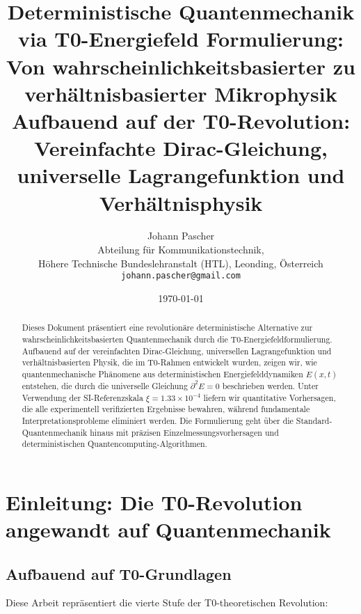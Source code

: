 \documentclass[12pt,a4paper]{article}
\newcommand{\Efield}{E}
\newcommand{\xipar}{\xi}
\begin{document}
	\title{Deterministische Quantenmechanik via T0-Energiefeld Formulierung: \\
		Von wahrscheinlichkeitsbasierter zu verhältnisbasierter Mikrophysik \\
		\large Aufbauend auf der T0-Revolution: Vereinfachte Dirac-Gleichung, universelle Lagrangefunktion und Verhältnisphysik}
	\author{Johann Pascher\\
		Abteilung für Kommunikationstechnik, \\Höhere Technische Bundeslehranstalt (HTL), Leonding, Österreich\\
		\texttt{johann.pascher@gmail.com}}
	\date{\today}
	
	\maketitle
	
	\begin{abstract}
		Dieses Dokument präsentiert eine revolutionäre deterministische Alternative zur\\ wahrscheinlichkeitsbasierten Quantenmechanik durch die T0-Energiefeldformulierung. Aufbauend auf der vereinfachten Dirac-Gleichung, universellen Lagrangefunktion und verhältnisbasierten Physik, die im T0-Rahmen entwickelt wurden, zeigen wir, wie quantenmechanische Phänomene aus deterministischen Energiefelddynamiken $\Efield(x,t)$ entstehen, die durch die universelle Gleichung $\partial^2 \Efield = 0$ beschrieben werden. Unter Verwendung der SI-Referenzskala $\xipar = 1.33 \times 10^{-4}$ liefern wir quantitative Vorhersagen, die alle experimentell verifizierten Ergebnisse bewahren, während fundamentale Interpretationsprobleme eliminiert werden. Die Formulierung geht über die Standard-Quantenmechanik hinaus mit präzisen Einzelmessungsvorhersagen und deterministischen Quantencomputing-Algorithmen.
	\end{abstract}
	
	\tableofcontents
	\newpage
	
	\section{Einleitung: Die T0-Revolution angewandt auf Quantenmechanik}
	
	\subsection{Aufbauend auf T0-Grundlagen}
	
	Diese Arbeit repräsentiert die vierte Stufe der T0-theoretischen Revolution:
	
\end{document}
